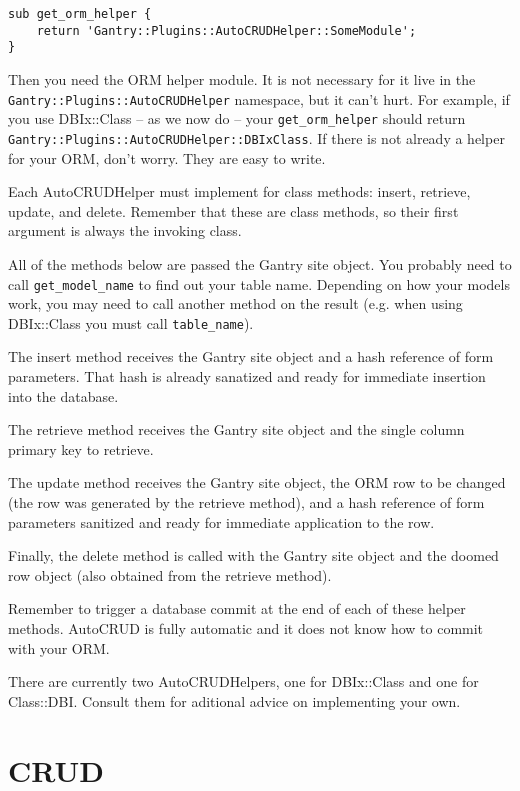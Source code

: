 \begin{verbatim}
sub get_orm_helper {
    return 'Gantry::Plugins::AutoCRUDHelper::SomeModule';
}
\end{verbatim}

Then you need the ORM helper module.  It is not necessary for it live in the
\verb+Gantry::Plugins::AutoCRUDHelper+ namespace, but it can't hurt.
For example, if you use DBIx::Class -- as we now do -- your
\verb+get_orm_helper+ should return
\verb+Gantry::Plugins::AutoCRUDHelper::DBIxClass+.  If there is not already
a helper for your ORM, don't worry.  They are easy to write.

Each AutoCRUDHelper must implement for class methods: insert, retrieve,
update, and delete.  Remember that these are class methods, so their
first argument is always the invoking class.

All of the methods below are passed the Gantry site object.  You probably
need to call \verb+get_model_name+ to find out your table name.  Depending
on how your models work, you may need to call another method on the result
(e.g. when using DBIx::Class you must call \verb+table_name+).

The insert method receives the Gantry site object and a hash reference of
form parameters.  That hash is already sanatized and ready for immediate
insertion into the database.

The retrieve method receives the Gantry site object and the single column
primary key to retrieve.  

The update method receives the Gantry site object, the ORM row to be
changed (the row was generated by the retrieve method), and a hash reference
of form parameters sanitized and ready for immediate application to the
row.

Finally, the delete method is called with the Gantry site object and the
doomed row object (also obtained from the retrieve method).

Remember to trigger a database commit at the end of each of these helper
methods.  AutoCRUD is fully automatic and it does not know how to commit
with your ORM.

There are currently two AutoCRUDHelpers, one for DBIx::Class and one for
Class::DBI.  Consult them for aditional advice on implementing your own.

\section{CRUD}

